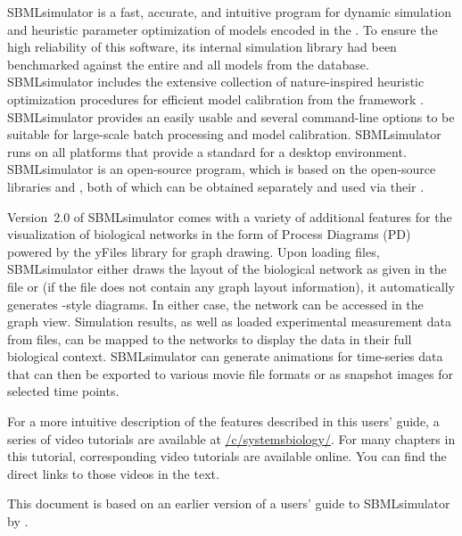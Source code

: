 SBMLsimulator is a fast, accurate, and intuitive program for dynamic simulation and heuristic parameter optimization of models encoded in the \SBML.
To ensure the high reliability of this software, its internal simulation library had been
benchmarked against the entire \SBMLTestSuite and all models from the \BioModels database.
SBMLsimulator includes the extensive collection of nature-inspired heuristic optimization procedures for efficient model calibration from the framework \EvA.
SBMLsimulator provides an easily usable \GUI and several command-line options to be suitable for large-scale batch processing and model calibration.
SBMLsimulator runs on all platforms that provide a standard \JVM for a desktop environment.
SBMLsimulator is an open-source program, which is based on the open-source libraries \JSBML and \SBSCL, both of which can be obtained separately and used via their \API.

Version~2.0 of SBMLsimulator comes with a variety of additional features for the visualization of biological networks in the form of \SBGN Process Diagrams (PD) powered by the yFiles library for graph drawing.
Upon loading \SBML files, SBMLsimulator either draws the layout of the biological network as given in the file or (if the \SBML file does not contain any graph layout information), it automatically generates \SBGN-style diagrams.
In either case, the network can be accessed in the graph view.
Simulation results, as well as loaded experimental measurement data from \CSV files, can be mapped to the networks to display the data in their full biological context.
SBMLsimulator can generate animations for time-series data that can then be exported to various movie file formats or as snapshot images for selected time points.

For a more intuitive description of the features described in this users' guide, a series of video tutorials are available at \href{https://youtube.com/c/systemsbiology/}{\faYoutube/c/systemsbiology/}.
For many chapters in this tutorial, corresponding video tutorials are available online.
You can find the direct links to those videos in the text.

This document is based on an earlier version of a users' guide to SBMLsimulator by \citet*{Doerr2014a}.